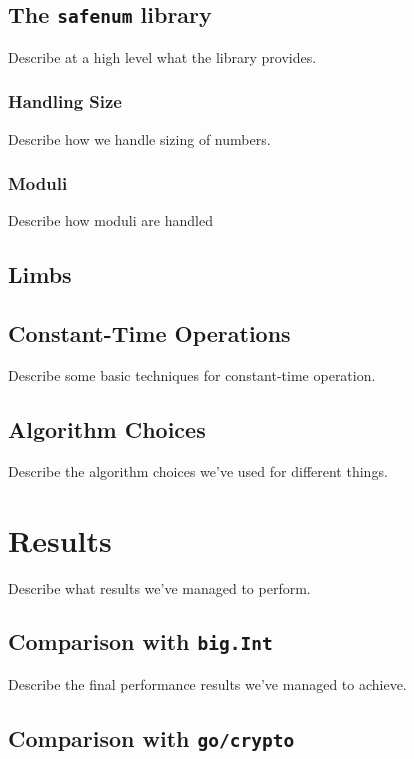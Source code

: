 \documentclass[11pt, a4paper]{article} %
\begin{document}
{\subsection{The \texttt{safenum} library}

Describe at a high level what the library provides.

\subsubsection{Handling Size}

Describe how we handle sizing of numbers.

\subsubsection{Moduli}

Describe how moduli are handled

\subsection{Limbs}

\subsection{Constant-Time Operations}

Describe some basic techniques for constant-time operation.

\subsection{Algorithm Choices}

Describe the algorithm choices we've used for different things.

\section{Results}

Describe what results we've managed to perform.

\subsection{Comparison with \texttt{big.Int}}

Describe the final performance results we've managed to achieve.

\subsection{Comparison with \texttt{go/crypto}}

}
\end{document}
